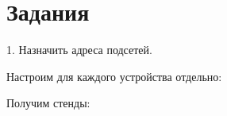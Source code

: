 \section*{Задания}

\Large 1. Назначить адреса подсетей.

Настроим для каждого устройства отдельно:

\begin{figure}[h]
\end{figure}

Получим стенды:

\begin{figure}[h]
\end{figure}

\begin{figure}[h]
\end{figure}
\newpage

